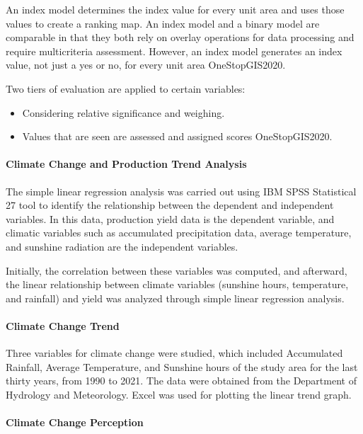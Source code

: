An index model determines the index value for every unit area and uses those values to create a ranking map. An index model and a binary model are comparable in that they both rely on overlay operations for data processing and require multicriteria assessment. However, an index model generates an index value, not just a yes or no, for every unit area OneStopGIS2020.

Two tiers of evaluation are applied to certain variables:
\begin{itemize}
    \item Considering relative significance and weighing.
    \item Values that are seen are assessed and assigned scores OneStopGIS2020.
\end{itemize}

\paragraph{Climate Change and Production Trend Analysis}

The simple linear regression analysis was carried out using IBM SPSS Statistical 27 tool to identify the relationship between the dependent and independent variables. In this data, production yield data is the dependent variable, and climatic variables such as accumulated precipitation data, average temperature, and sunshine radiation are the independent variables.

Initially, the correlation between these variables was computed, and afterward, the linear relationship between climate variables (sunshine hours, temperature, and rainfall) and yield was analyzed through simple linear regression analysis.

\paragraph{Climate Change Trend}

Three variables for climate change were studied, which included Accumulated Rainfall, Average Temperature, and Sunshine hours of the study area for the last thirty years, from 1990 to 2021. The data were obtained from the Department of Hydrology and Meteorology. Excel was used for plotting the linear trend graph.

\paragraph{Climate Change Perception}

